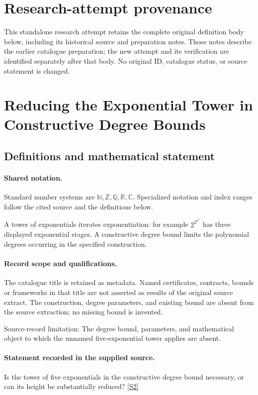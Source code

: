 \documentclass[11pt]{article}
\begin{document}
\section*{Research-attempt provenance}
This standalone research attempt retains the complete original definition body below,
including its historical source and preparation notes. Those notes describe the
earlier catalogue preparation; the new attempt and its verification are identified
separately after that body. No original ID, catalogue status, or source statement is changed.

\section{Reducing the Exponential Tower in Constructive Degree Bounds}\label{statement}

\subsection{Definitions and mathematical statement}

\paragraph{Shared notation.}Standard number systems are $\mathbb N,\mathbb Z,\mathbb Q,\mathbb R,\mathbb C$. Specialized notation and index ranges follow the cited source and the definitions below.


A tower of exponentials iterates exponentiation: for example $2^{2^{2^x}}$ has three displayed exponential stages. A constructive degree bound limits the polynomial degrees occurring in the specified construction.
\paragraph{Record scope and qualifications.}
The catalogue title is retained as metadata. Named certificates, contracts, bounds or frameworks in that title are not asserted as results of the original source extract.
The construction, degree parameters, and existing bound are absent from the source extraction; no missing bound is invented.

Source-record limitation: The degree bound, parameters, and mathematical object to which the unnamed five-exponential tower applies are absent.
\paragraph{Statement recorded in the supplied source.}
Is the tower of five exponentials in the constructive degree bound necessary, or can its height be substantially reduced? \href{https://doi.org/10.4171/owr/2017/14}{[S2]}
\end{document}
